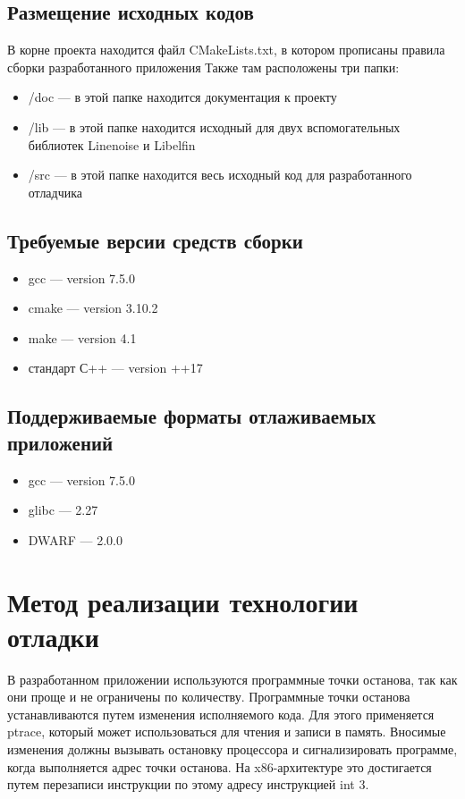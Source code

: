 \documentclass[a4paper,14pt,oneside]{extreport}  %
\begin{document}
\subsection{Размещение исходных кодов}
В корне проекта находится файл CMakeLists.txt, в котором прописаны правила сборки разработанного приложения
Также там расположены три папки:\\
	\begin{itemize}
	\item /doc — в этой папке находится документация к проекту\\
	\item /lib — в этой папке находится исходный для двух вспомогательных библиотек Linenoise и Libelfin\\
	\item /src — в этой папке находится весь исходный код для разработанного отладчика\\
\end{itemize}
\subsection{Требуемые версии средств сборки}
	\begin{itemize}
	\item gcc — version 7.5.0 
	\item cmake —  version 3.10.2
	\item make — version 4.1
	\item стандарт С++ —  version ++17
\end{itemize}
\subsection{Поддерживаемые форматы отлаживаемых приложений}
	\begin{itemize}
	\item gcc — version 7.5.0 
	\item glibc — 2.27
	\item  DWARF  — 2.0.0
\end{itemize}

\section{Метод реализации технологии отладки}
В разработанном приложении используются программные точки останова, так как они проще и не ограничены по количеству. Программные точки останова устанавливаются путем изменения исполняемого кода. Для этого применяется ptrace, который может использоваться для чтения и записи в память. Вносимые изменения должны вызывать остановку процессора и сигнализировать программе, когда выполняется адрес точки останова. На x86-архитектуре это достигается путем перезаписи инструкции по этому адресу инструкцией int 3.
\end{document}
